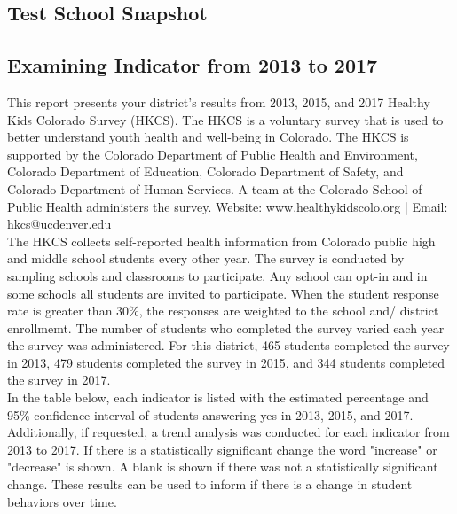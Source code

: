 \documentclass[11pt]{article}
\begin{document}



\begin{center}
  \section*{Test School Snapshot}
  \subsection*{Examining Indicator from 2013 to 2017}
\end{center}
\vspace{-0.5cm}
\noindent\makebox[\linewidth]{\rule{\paperwidth}{1pt}}

\vspace{0.15in}
\noindent This report presents your district's results from 2013, 2015, and 2017 Healthy Kids Colorado Survey (HKCS). The HKCS is a voluntary survey that is used to better understand youth health and well-being in Colorado. The HKCS is supported by the Colorado Department of Public Health and Environment, Colorado Department of Education, Colorado Department of Safety, and Colorado Department of Human Services. A team at the Colorado School of Public Health administers the survey. Website: www.healthykidscolo.org | Email: hkcs@ucdenver.edu \\

\noindent The HKCS collects self-reported health information from Colorado public high and middle school students every other year. The survey is conducted by sampling schools and classrooms to participate. Any school can opt-in and in some schools all students are invited to participate. When the student response rate is greater than 30\%, the responses are weighted to the school and/ district enrollmemt. The number of students who completed the survey varied each year the survey was administered. For this district, 465 students completed the survey in 2013, 479 students completed the survey in 2015, and 344 students completed the survey in 2017.\\

\noindent In the table below, each indicator is listed with the estimated percentage and 95\% confidence interval of students answering yes in 2013, 2015, and 2017. Additionally, if requested, a trend analysis was conducted for each indicator from 2013 to 2017. If there is a statistically significant change the word "increase" or "decrease" is shown. A blank is shown if there was not a statistically significant change. These results can be used to inform if there is a change in student behaviors over time.
\end{document}

